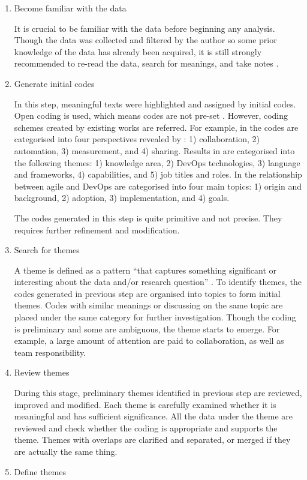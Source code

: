 \documentclass[
  12pt,
  a4paper,
]{article}
\begin{document}
\begin{enumerate}
\def\labelenumi{\arabic{enumi}.}
\item
  Become familiar with the data

  It is crucial to be familiar with the data before beginning any
  analysis. Though the data was collected and filtered by the author so
  some prior knowledge of the data has already been acquired, it is
  still strongly recommended to re-read the data, search for meanings,
  and take notes \citep{braun:2006:thematic-psy}.
\item
  Generate initial codes

  In this step, meaningful texts were highlighted and assigned by
  initial codes. Open coding is used, which means codes are not pre-set
  \citep{Maguire:2017}. However, coding schemes created by existing
  works are referred. For example, in \citep{bang2013ksa} the codes are
  categorised into four perspectives revealed by \citep{Humble:2011}: 1)
  collaboration, 2) automation, 3) measurement, and 4) sharing. Results
  in \citep{hussain2017nz} are categorised into the following themes: 1)
  knowledge area, 2) DevOps technologies, 3) language and frameworks, 4)
  capabilities, and 5) job titles and roles. In
  \citep{lwakatare2016:relationship} the relationship between agile and
  DevOps are categorised into four main topics: 1) origin and
  background, 2) adoption, 3) implementation, and 4) goals.

  The codes generated in this step is quite primitive and not precise.
  They requires further refinement and modification.
\item
  Search for themes

  A theme is defined as a pattern ``that captures something significant
  or interesting about the data and/or research question''
  \citep{Maguire:2017}. To identify themes, the codes generated in
  previous step are organised into topics to form initial themes. Codes
  with similar meanings or discussing on the same topic are placed under
  the same category for further investigation. Though the coding is
  preliminary and some are ambiguous, the theme starts to emerge. For
  example, a large amount of attention are paid to collaboration, as
  well as team responsibility.
\item
  Review themes

  During this stage, preliminary themes identified in previous step are
  reviewed, improved and modified. Each theme is carefully examined
  whether it is meaningful and has sufficient significance. All the data
  under the theme are reviewed and check whether the coding is
  appropriate and supports the theme. Themes with overlaps are clarified
  and separated, or merged if they are actually the same thing.
\item
  Define themes


\end{enumerate}
\end{document}
